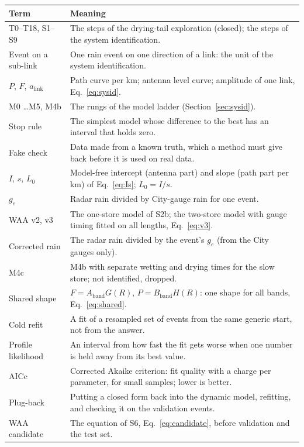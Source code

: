 \documentclass[11pt,a4paper]{article}
\begin{document}
\begin{tabularx}{\linewidth}{@{}l Y@{}}
\toprule
\textbf{Term} & \textbf{Meaning} \\
\midrule
T0--T18, S1--S9 & The steps of the drying-tail exploration (closed); the steps of the system identification. \\
Event on a sub-link & One rain event on one direction of a link: the unit of the system identification. \\
$P$, $F$, $a_{\mathrm{link}}$ & Path curve per km; antenna level curve; amplitude of one link, Eq.~\eqref{eq:sysid}. \\
M0 \ldots M5, M4b & The rungs of the model ladder (Section~\ref{sec:sysid}). \\
Stop rule & The simplest model whose difference to the best has an interval that holds zero. \\
Fake check & Data made from a known truth, which a method must give back before it is used on real data. \\
$I$, $s$, $L_0$ & Model-free intercept (antenna part) and slope (path part per km) of Eq.~\eqref{eq:Is}; $L_0 = I/s$. \\
$g_e$ & Radar rain divided by City-gauge rain for one event. \\
WAA v2, v3 & The one-store model of S2b; the two-store model with gauge timing fitted on all lengths, Eq.~\eqref{eq:v3}. \\
Corrected rain & The radar rain divided by the event's $g_e$ (from the City gauges only). \\
M4c & M4b with separate wetting and drying times for the slow store; not identified, dropped. \\
Shared shape & $F = A_{\mathrm{band}}G(R)$, $P = B_{\mathrm{band}}H(R)$: one shape for all bands, Eq.~\eqref{eq:shared}. \\
Cold refit & A fit of a resampled set of events from the same generic start, not from the answer. \\
Profile likelihood & An interval from how fast the fit gets worse when one number is held away from its best value. \\
AICc & Corrected Akaike criterion: fit quality with a charge per parameter, for small samples; lower is better. \\
Plug-back & Putting a closed form back into the dynamic model, refitting, and checking it on the validation events. \\
WAA candidate & The equation of S6, Eq.~\eqref{eq:candidate}, before validation and the test set. \\

\end{tabularx}
\end{document}
